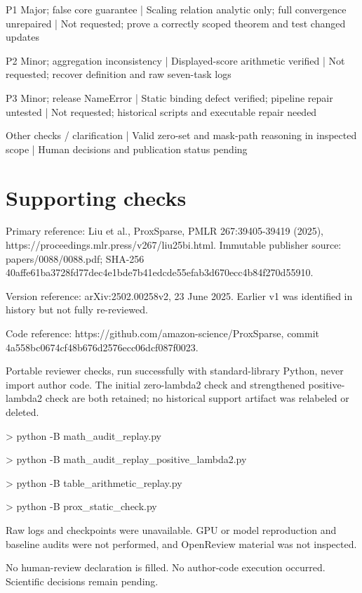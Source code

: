 \documentclass[10pt]{article}
\begin{document}
P1 Major; false core guarantee | Scaling relation analytic only; full convergence unrepaired | Not requested; prove a correctly scoped theorem and test changed updates\par
P2 Minor; aggregation inconsistency | Displayed-score arithmetic verified | Not requested; recover definition and raw seven-task logs\par
P3 Minor; release NameError | Static binding defect verified; pipeline repair untested | Not requested; historical scripts and executable repair needed\par
Other checks / clarification | Valid zero-set and mask-path reasoning in inspected scope | Human decisions and publication status pending\par
\section*{Supporting checks}
Primary reference: Liu et al., ProxSparse, PMLR 267:39405-39419 (2025), https://proceedings.mlr.press/v267/liu25bi.html. Immutable publisher source: papers/0088/0088.pdf; SHA-256 40affe61ba3728fd77dec4e1bde7b41edcde55efab3d670ecc4b84f270d55910.\par
Version reference: arXiv:2502.00258v2, 23 June 2025. Earlier v1 was identified in history but not fully re-reviewed.\par
Code reference: https://github.com/amazon-science/ProxSparse, commit 4a558bc0674cf48b676d2576ecc06dcf087f0023.\par
Portable reviewer checks, run successfully with standard-library Python, never import author code. The initial zero-lambda2 check and strengthened positive-lambda2 check are both retained; no historical support artifact was relabeled or deleted.\par
> python -B math\_audit\_replay.py\par
> python -B math\_audit\_replay\_positive\_lambda2.py\par
> python -B table\_arithmetic\_replay.py\par
> python -B prox\_static\_check.py\par
Raw logs and checkpoints were unavailable. GPU or model reproduction and baseline audits were not performed, and OpenReview material was not inspected.\par
No human-review declaration is filled. No author-code execution occurred. Scientific decisions remain pending.\par
\end{document}
